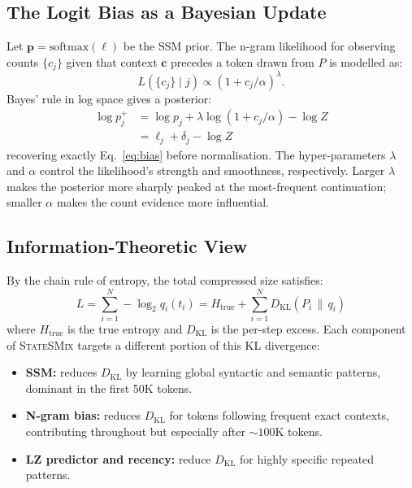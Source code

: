\documentclass[10pt,twocolumn]{article}
\newcommand{\ssmcomp}{\textsc{StateSMix}}
\begin{document}
\subsection{The Logit Bias as a Bayesian Update}

Let $\mathbf{p} = \mathrm{softmax}(\boldsymbol{\ell})$ be the SSM
prior.  The n-gram likelihood for observing counts $\{c_j\}$ given
that context $\mathbf{c}$ precedes a token drawn from $P$ is modelled
as:
\begin{equation}
  L(\{c_j\} \mid j) \propto (1+c_j/\alpha)^\lambda.
\end{equation}
Bayes' rule in log space gives a posterior:
\begin{align}
  \log p^+ _j &= \log p_j + \lambda\log(1+c_j/\alpha) - \log Z \\
               &= \ell_j + \delta_j - \log Z
\end{align}
recovering exactly Eq.~\eqref{eq:bias} before normalisation.
The hyper-parameters $\lambda$ and $\alpha$ control the
likelihood's strength and smoothness, respectively.
Larger $\lambda$ makes the posterior more sharply peaked at the
most-frequent continuation; smaller $\alpha$ makes the count evidence
more influential.

\subsection{Information-Theoretic View}

By the chain rule of entropy, the total compressed size satisfies:
\begin{equation}
  L = \sum_{i=1}^N -\log_2 q_i(t_i)
    = H_\text{true} + \sum_{i=1}^N D_\mathrm{KL}(P_i\,\|\,q_i)
\end{equation}
where $H_\text{true}$ is the true entropy and $D_\mathrm{KL}$
is the per-step excess.  Each component of \ssmcomp{} targets a
different portion of this KL divergence:

\begin{itemize}
  \item \textbf{SSM:} reduces $D_\mathrm{KL}$ by learning global
    syntactic and semantic patterns, dominant in the first 50K tokens.
  \item \textbf{N-gram bias:} reduces $D_\mathrm{KL}$ for tokens
    following frequent exact contexts, contributing throughout
    but especially after ${\sim}100$K tokens.
  \item \textbf{LZ predictor and recency:} reduce $D_\mathrm{KL}$
    for highly specific repeated patterns.
\end{itemize}
\end{document}
